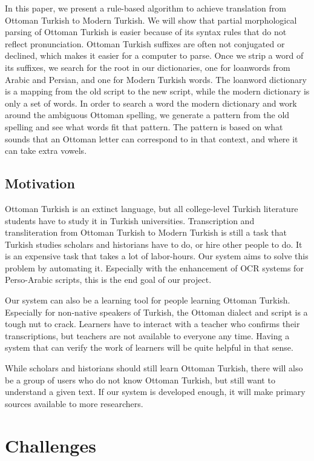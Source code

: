 \documentclass[10pt,twocolumn]{article}
\theoremstyle{nonumberplain}
\begin{document}
In this paper, we present a rule-based algorithm to achieve translation from
Ottoman Turkish to Modern Turkish.  We will show that partial morphological
parsing of Ottoman Turkish is easier because of its syntax rules that do not
reflect pronunciation. Ottoman Turkish suffixes are often not conjugated or
declined, which makes it easier for a computer to parse.
Once we strip a word of its suffixes, we search for the root in our
dictionaries, one for loanwords from Arabic and Persian, and one for Modern
Turkish words. The loanword dictionary is a mapping
from the old script to the new script, while the modern dictionary is only a
set of words. In order to search a word the modern dictionary and work around
the ambiguous Ottoman spelling, we generate a pattern from the old spelling and
see what words fit that pattern.
The pattern is based on what sounds that an Ottoman letter can correspond to in
that context, and where it can take extra vowels.

\subsection{Motivation}

Ottoman Turkish is an extinct language, but all college-level Turkish
literature students have to study it in Turkish universities.
Transcription and transliteration from Ottoman Turkish to Modern Turkish is
still a task that Turkish studies scholars and historians have to do, or hire
other people to do. It is an expensive task that takes a lot of labor-hours.
Our system aims to solve this problem by automating it.
Especially with the enhancement of OCR systems for Perso-Arabic scripts,
this is the end goal of our project.

Our system can also be a learning tool for people learning Ottoman Turkish.
Especially for non-native speakers of Turkish, the Ottoman dialect and script
is a tough nut to crack. Learners have to interact with a teacher who confirms
their transcriptions, but teachers are not available to everyone any time.
Having a system that can verify the work of learners will be quite helpful in that sense.

While scholars and historians should still learn Ottoman Turkish, there will
also be a group of users who do not know Ottoman Turkish, but still want to
understand a given text. If our system is developed enough, it will make
primary sources available to more researchers.

\section{Challenges}
\end{document}
